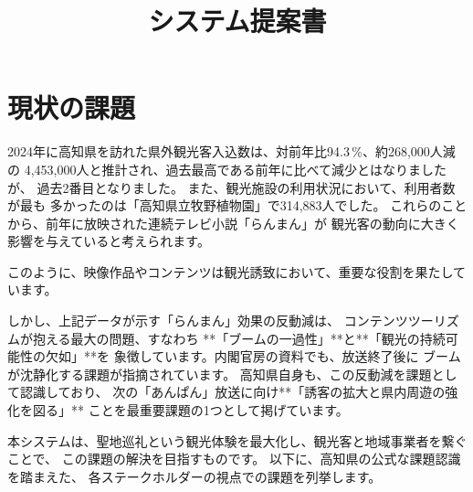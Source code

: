 \documentclass{docs}
\title{システム提案書}
\begin{document}
\section{現状の課題}\label{sec:issues}
2024年に高知県を訪れた県外観光客入込数は、対前年比94.3\,\%、約268,000人減の
4,453,000人と推計され、過去最高である前年に比べて減少とはなりましたが、
過去2番目となりました。
また、観光施設の利用状況において、利用者数が最も
多かったのは「高知県立牧野植物園」で314,883人でした\cite{kochi_tourism_stat}。
これらのことから、前年に放映された連続テレビ小説「らんまん」が
観光客の動向に大きく影響を与えていると考えられます。

このように、映像作品やコンテンツは観光誘致において、重要な役割を果たしています。

しかし、上記データが示す「らんまん」効果の反動減は、
コンテンツツーリズムが抱える最大の問題、すなわち
**「ブームの一過性」**と**「観光の持続可能性の欠如」**を
象徴しています。内閣官房の資料\cite{cas_kadokawa}でも、放送終了後に
ブームが沈静化する課題が指摘されています。
高知県自身も、この反動減を課題として認識しており、
次の「あんぱん」放送に向け**「誘客の拡大と県内周遊の強化を図る」**
ことを最重要課題の1つとして掲げています\cite{kochi_r7_plan}。

本システムは、聖地巡礼という観光体験を最大化し、観光客と地域事業者を繋ぐことで、
この課題の解決を目指すものです。
以下に、高知県の公式な課題認識\cite{kochi_dx_plan}を踏まえた、
各ステークホルダーの視点での課題を列挙します。
\end{document}
